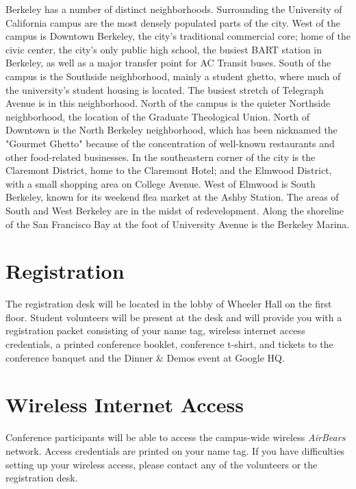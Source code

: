 Berkeley has a number of distinct neighborhoods. Surrounding the University of California campus are the most densely populated parts of the city. West of the campus is Downtown Berkeley, the city's traditional commercial core; home of the civic center, the city's only public high school, the busiest BART station in Berkeley, as well as a major transfer point for AC Transit buses. South of the campus is the Southside neighborhood, mainly a student ghetto, where much of the university's student housing is located. The busiest stretch of Telegraph Avenue is in this neighborhood. North of the campus is the quieter Northside neighborhood, the location of the Graduate Theological Union. North of Downtown is the North Berkeley neighborhood, which has been nicknamed the "Gourmet Ghetto" because of the concentration of well-known restaurants and other food-related businesses. In the southeastern corner of the city is the Claremont District, home to the Claremont Hotel; and the Elmwood District, with a small shopping area on College Avenue. West of Elmwood is South Berkeley, known for its weekend flea market at the Ashby Station. The areas of South and West Berkeley are in the midst of redevelopment. Along the shoreline of the San Francisco Bay at the foot of University Avenue is the Berkeley Marina. 




\vspace{3mm}

\section*{Registration}

The registration desk will be located in the lobby of Wheeler Hall on the first floor. Student volunteers will be present at the desk and will provide you with a registration packet consisting of your name tag, wireless internet access credentials, a printed conference booklet, conference t-shirt, and tickets to the conference banquet and the Dinner \& Demos event at Google HQ.

\vspace{3mm}
\section*{Wireless Internet Access}
Conference participants will be able to access the campus-wide wireless \emph{AirBears} network. Access credentials are printed on your name tag. If you have difficulties setting up your wireless access, please contact any of the volunteers or the registration desk.

